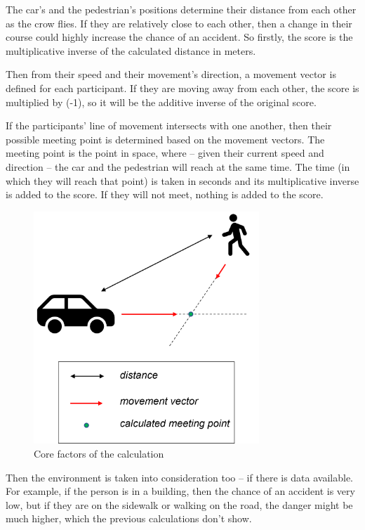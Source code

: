 \documentclass[conference]{IEEEtran}
\begin{document}
The car's and the pedestrian's positions determine their distance from each other as the crow flies. If they are relatively close to each other, then a change in their course could highly increase the chance of an accident. So firstly, the score is the multiplicative inverse of the calculated distance in meters.

Then from their speed and their movement's direction, a movement vector is defined for each participant. If they are moving away from each other, the score is multiplied by (-1), so it will be the additive inverse of the original score.

If the participants' line of movement intersects with one another, then their possible meeting point is determined based on the movement vectors. The meeting point is the point in space, where -- given their current speed and direction -- the car and the pedestrian will reach at the same time. The time (in which they will reach that point) is taken in seconds and its multiplicative inverse is added to the score. If they will not meet, nothing is added to the score.

\begin{figure}[ht]
    \centering
    \includegraphics[width=8.5cm]{./pics/Core factors of the calculation.png}
    \caption{Core factors of the calculation}
\end{figure}

Then the environment is taken into consideration too -- if there is data available. For example, if the person is in a building, then the chance of an accident is very low, but if they are on the sidewalk or walking on the road, the danger might be much higher, which the previous calculations don't show.
\end{document}
